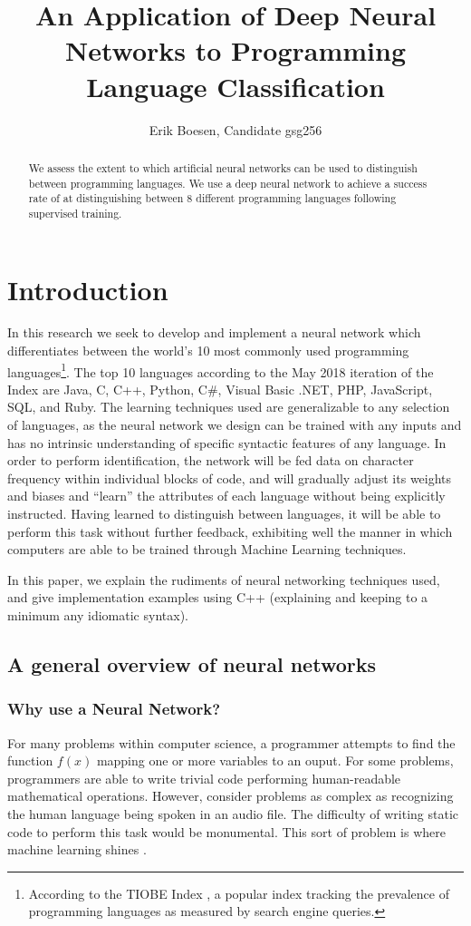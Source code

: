 \documentclass{article}
\begin{document}
\title{An Application of Deep Neural Networks to Programming Language Classification}
\author{Erik Boesen, Candidate gsg256}
\maketitle

\begin{abstract}
We assess the extent to which artificial neural networks can be used to distinguish between programming languages. We use a deep neural network to achieve a success rate of  at distinguishing between 8 different programming languages following supervised training.
\end{abstract}

\section{Introduction}
In this research we seek to develop and implement a neural network which differentiates between the world's 10 most commonly used programming languages\footnote{According to the TIOBE Index \cite{tiobe}, a popular index tracking the prevalence of programming languages as measured by search engine queries.}. The top 10 languages according to the May 2018 iteration of the Index are Java, C, C++, Python, C\#, Visual Basic .NET, PHP, JavaScript, SQL, and Ruby. The learning techniques used are generalizable to any selection of languages, as the neural network we design can be trained with any inputs and has no intrinsic understanding of specific syntactic features of any language. In order to perform identification, the network will be fed data on character frequency within individual blocks of code, and will gradually adjust its weights and biases and ``learn'' the attributes of each language without being explicitly instructed. Having learned to distinguish between languages, it will be able to perform this task without further feedback, exhibiting well the manner in which computers are able to be trained through Machine Learning techniques.

In this paper, we explain the rudiments of neural networking techniques used, and give implementation examples using C++ (explaining and keeping to a minimum any idiomatic syntax).

\subsection{A general overview of neural networks}
\subsubsection{Why use a Neural Network?}
For many problems within computer science, a programmer attempts to find the function $f(x)$ mapping one or more variables to an ouput. For some problems, programmers are able to write trivial code performing human-readable mathematical operations. However, consider problems as complex as recognizing the human language being spoken in an audio file. The difficulty of writing static code to perform this task would be monumental. This sort of problem is where machine learning shines \cite{10algos}.
\end{document}
